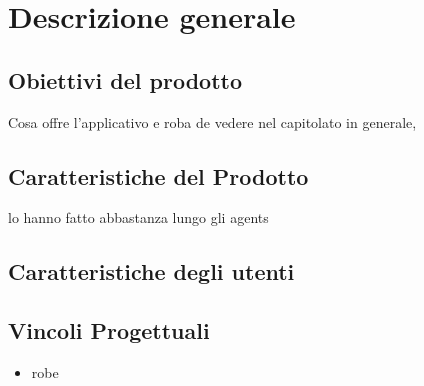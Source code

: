 \section{Descrizione generale}
	\subsection{Obiettivi del prodotto}
	Cosa offre l'applicativo e roba de vedere nel capitolato in generale, 
	\subsection{Caratteristiche del Prodotto}
	 lo hanno fatto abbastanza lungo gli agents 
	 \subsection{Caratteristiche degli utenti}
	 \subsection{Vincoli Progettuali}
	 	\begin{itemize}
	 		\item robe
	 	\end{itemize}